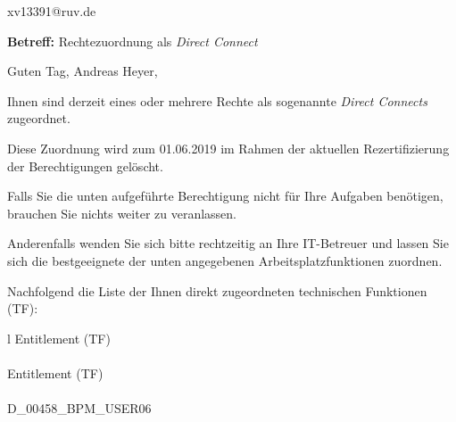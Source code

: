 \documentclass[a4paper,landscape,12pt]{letter}
\begin{document}
\begin{letter}{xv13391@ruv.de\hfill \break}
\begin{normalsize}
	\opening{\textbf{Betreff:} Rechtezuordnung als \emph{Direct Connect}}
	\begin{normalsize} \hfill
	\end{normalsize}

	\begin{normalsize}
		Guten Tag, 
	Andreas Heyer, \hfill \break
	\end{normalsize}
	\end{normalsize}
	
\begin{normalsize}
	Ihnen sind derzeit eines oder mehrere Rechte als sogenannte \emph{Direct Connects} zugeordnet.
	
	Diese Zuordnung wird zum 01.06.2019 im Rahmen der aktuellen Rezertifizierung der Berechtigungen gelöscht.
	
	Falls Sie die unten aufgeführte Berechtigung nicht für Ihre Aufgaben benötigen, 
	brauchen Sie nichts weiter zu veranlassen.
	
	Anderenfalls wenden Sie sich bitte rechtzeitig an Ihre IT-Betreuer 
	und lassen Sie sich die bestgeeignete der unten angegebenen Arbeitsplatzfunktionen zuordnen.
	\end{normalsize}
	
\begin{normalsize}
	Nachfolgend die Liste der Ihnen direkt zugeordneten technischen Funktionen (TF):

	\begin{longtable}{l}
		Entitlement (TF) \\ \hline
		\endfirsthead
		\\\hline
		Entitlement (TF) \\ \hline
		\endhead %
		\multicolumn{1}{r@{}}{Fortsetzung \ldots}\\
		\endfoot
		\hline
		\endlastfoot
	D\_00458\_BPM\_USER06\\
	\end{longtable}
	\end{normalsize}
	

\end{letter}
\end{document}
